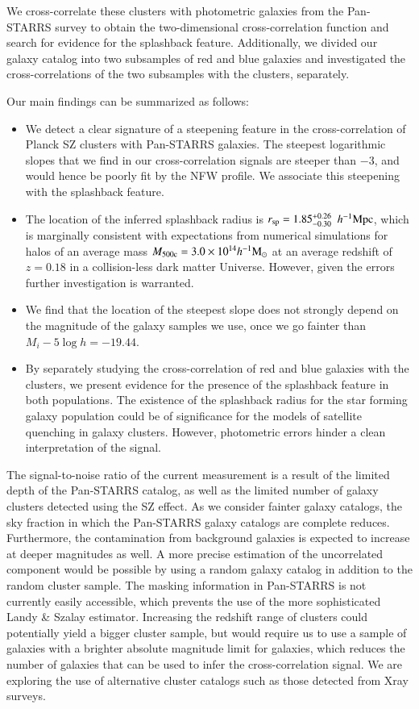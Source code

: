 \documentclass[iop, apjl, twocolappendix, numberedappendix]{emulateapj}
\def\mpch{h^{-1}{\rm Mpc}}
\def\msunh{h^{-1}{\rm M_{\odot}}}
\begin{document}
We cross-correlate these clusters with photometric galaxies from the
Pan-STARRS survey to obtain the two-dimensional cross-correlation
function and search for evidence for the splashback feature.
Additionally, we divided our galaxy catalog into two subsamples of
red and blue galaxies and investigated the cross-correlations of the
two subsamples with the clusters, separately.

Our main findings can be summarized as follows:
\begin{itemize}
\item We detect a clear signature of a steepening feature in the
cross-correlation of Planck SZ clusters with Pan-STARRS
galaxies. The steepest logarithmic slopes that we find in our cross-correlation
signals are steeper than $-3$, and would hence be poorly fit by the
NFW profile. We associate this steepening with the splashback feature.
\item The location of the inferred splashback radius is $r_{\rm
sp}=1.85_{-0.30}^{+0.26}$ $\mpch$, which is marginally consistent 
with expectations from numerical simulations for
halos of an average mass $M_{\rm 500c}=3.0\times10^{14}\msunh$ at an
average redshift of $z=0.18$ in a collision-less dark matter Universe.
However, given the errors further investigation is warranted.
\item We find that the location of the steepest slope does not
strongly depend on the magnitude of the galaxy samples we use, once
we go fainter than $M_i-5\log h=-19.44$.
\item By separately studying the cross-correlation of red and blue
galaxies with the clusters, we present evidence for the presence of
the splashback feature in both populations. The existence of the
splashback radius for the
star forming galaxy population could be of significance for the
models of satellite quenching in galaxy clusters. However, photometric
errors hinder a clean interpretation of the signal.
\end{itemize}

The signal-to-noise ratio of the current measurement is a result of
the limited depth of the Pan-STARRS catalog, as well as the limited
number of galaxy clusters detected using the SZ effect. As we consider
fainter galaxy catalogs, the sky fraction in which the Pan-STARRS
galaxy catalogs are complete reduces. Furthermore, the contamination
from background galaxies is expected to increase at deeper magnitudes
as well. A more precise estimation of the
uncorrelated component would be possible by using a random galaxy
catalog in addition to the random cluster sample. The masking
information in Pan-STARRS is not currently easily accessible, which
prevents the use of the more sophisticated Landy \& Szalay estimator.
Increasing the redshift range of clusters could potentially yield a
bigger cluster sample, but would require us to use a sample of
galaxies with a brighter absolute magnitude limit for galaxies,
which reduces the number of galaxies that can be used to infer the
cross-correlation signal. We are exploring the use of alternative
cluster catalogs such as those detected from Xray surveys.
\end{document}
